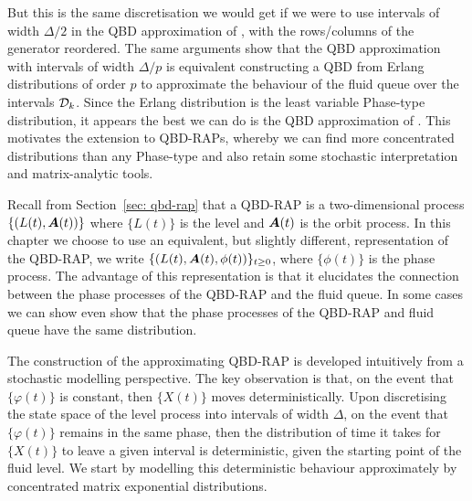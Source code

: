 But this is the same discretisation we would get if we were to use intervals of width \(\Delta/2\) in the QBD approximation of \cite{bo2013}, with the rows/columns of the generator reordered. The same arguments show that the QBD approximation with intervals of width \(\Delta/p\) is equivalent constructing a QBD from Erlang distributions of order \(p\) to approximate the behaviour of the fluid queue over the intervals \(\mathcal{D}_k\). Since the Erlang distribution is the least variable Phase-type distribution, it appears the best we can do is the QBD approximation of \cite{bo2013}. %
This motivates the extension to QBD-RAPs, whereby we can find more concentrated distributions than any Phase-type and also retain some stochastic interpretation and matrix-analytic tools. 

Recall from Section~\ref{sec: qbd-rap} that a QBD-RAP is a two-dimensional process \(\{(L(t),\boldsymbol A(t))\}\) where \(\{L(t)\}\) is the level and \(\boldsymbol A(t)\) is the orbit process. In this chapter we choose to use an equivalent, but slightly different, representation of the QBD-RAP, we write \(\{(L(t),\boldsymbol A(t),\phi(t))\}_{t\geq 0}\), where \(\{\phi(t)\}\) is the phase process. The advantage of this representation is that it elucidates the connection between the phase processes of the QBD-RAP and the fluid queue. In some cases we can show even show that the phase processes of the QBD-RAP and fluid queue have the same distribution.

The construction of the approximating QBD-RAP is developed intuitively from a stochastic modelling perspective. The key observation is that, on the event that \(\{\varphi(t)\}\) is constant, then \(\{X(t)\}\) moves deterministically. Upon discretising the state space of the level process into intervals of width \(\Delta\), on the event that \(\{\varphi(t)\}\) remains in the same phase, then the distribution of time it takes for \(\{X(t)\}\) to leave a given interval is deterministic, given the starting point of the fluid level. We start by modelling this deterministic behaviour approximately by concentrated matrix exponential distributions.%

